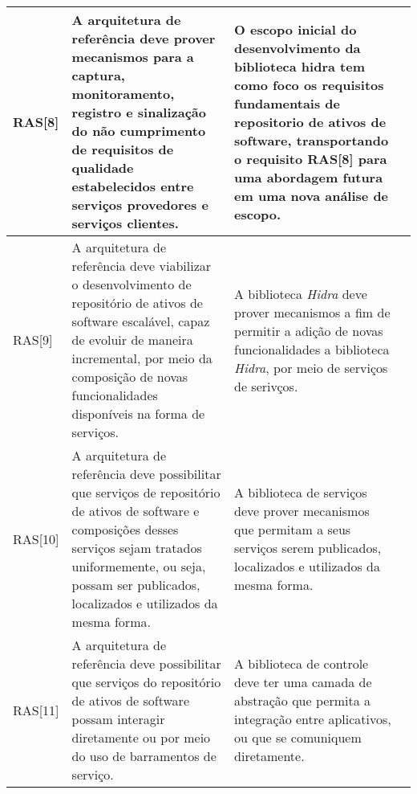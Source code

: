 \begin{longtable}{ | l | p{6cm} | p{2cm} | p{4cm} |}
RAS[8] & 
A arquitetura de referência deve prover mecanismos para a  captura, monitoramento, registro e sinalização do não  cumprimento de requisitos de qualidade estabelecidos entre  serviços provedores e serviços clientes. & O escopo inicial do desenvolvimento da biblioteca hidra tem como foco os requisitos fundamentais de repositorio de ativos de software, transportando o requisito RAS[8] para uma abordagem futura em uma nova análise de escopo.
 \\ \hline 

RAS[9] & 
A arquitetura de referência deve viabilizar o desenvolvimento
de repositório de ativos de software escalável, capaz de evoluir 
de maneira incremental, por meio da composição de novas 
funcionalidades disponíveis na forma de serviços. & A biblioteca \textit{Hidra} deve prover mecanismos a fim de permitir a adição de novas funcionalidades a biblioteca \textit{Hidra}, por meio de serviços de serivços.
 \\ \hline 
 RAS[10] & 
A arquitetura de referência deve possibilitar que serviços de  repositório de ativos de software e composições desses  serviços sejam tratados uniformemente, ou seja, possam ser  publicados, localizados e utilizados da mesma forma. & A biblioteca de serviços deve prover mecanismos que permitam a seus serviços serem publicados, localizados e utilizados da mesma forma.
 \\ \hline 
 
 RAS[11] & 

A arquitetura de referência deve possibilitar que serviços do  repositório de ativos de software possam interagir diretamente  ou por meio do uso de barramentos de serviço. & 
A biblioteca de controle deve ter uma camada de abstração que permita a integração entre aplicativos, ou que se comuniquem diretamente.

 \\ \hline 

\end{longtable}

